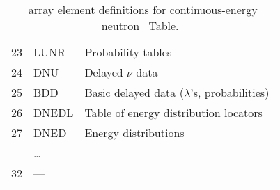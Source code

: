 \begin{table}
\begin{tabular}{rll}
    23       & LUNR   & Probability tables \\
    24       & DNU    & Delayed $\overline{\nu}$ data \\
    25       & BDD    & Basic delayed data ($\lambda$'s, probabilities) \\
    26       & DNEDL  & Table of energy distribution locators \\
    27       & DNED   & Energy distributions \\
             & \ldots & \\
    32       & ---    & \\
    \bottomrule
  \end{tabular}
  \caption{\JXS\ array element definitions for continuous-energy neutron \ACE\ Table.}
  \label{tab:JXSContinuousEnergyNeutron}
\end{table}
